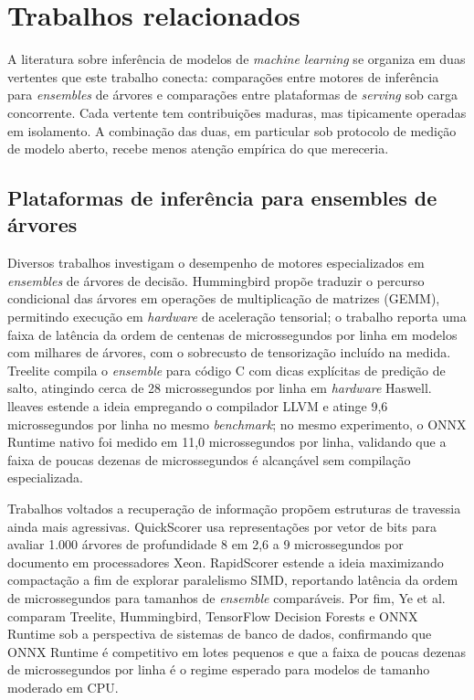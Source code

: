 \section{Trabalhos relacionados}

A literatura sobre inferência de modelos de \textit{machine learning} se
organiza em duas vertentes que este trabalho conecta: comparações entre
motores de inferência para \textit{ensembles} de árvores e comparações
entre plataformas de \textit{serving} sob carga concorrente. Cada vertente tem
contribuições maduras, mas tipicamente operadas em isolamento. A combinação
das duas, em particular sob protocolo de medição de modelo aberto, recebe
menos atenção empírica do que mereceria.

\subsection{Plataformas de inferência para ensembles de árvores}

Diversos trabalhos investigam o desempenho de motores especializados em
\textit{ensembles} de árvores de decisão. Hummingbird \cite{nakandala2020}
propõe traduzir o percurso condicional das árvores em operações de
multiplicação de matrizes (GEMM), permitindo execução em \textit{hardware}
de aceleração tensorial; o trabalho reporta uma faixa de latência da ordem
de centenas de microssegundos por linha em modelos com milhares de árvores,
com o sobrecusto de tensorização incluído na medida. Treelite
\cite{cho2018} compila o \textit{ensemble} para código C com dicas explícitas
de predição de salto, atingindo cerca de 28 microssegundos por linha em
\textit{hardware} Haswell. lleaves \cite{sieboehm2021} estende a ideia
empregando o compilador LLVM e atinge 9,6 microssegundos por linha no
mesmo \textit{benchmark}; no mesmo experimento, o ONNX Runtime nativo
foi medido em 11,0 microssegundos por linha, validando que a faixa de
poucas dezenas de microssegundos é alcançável sem compilação especializada.

Trabalhos voltados a recuperação de informação propõem estruturas de
travessia ainda mais agressivas. QuickScorer \cite{lucchese2015} usa
representações por vetor de bits para avaliar 1.000 árvores de profundidade
8 em 2,6 a 9 microssegundos por documento em processadores Xeon.
RapidScorer \cite{ye2018} estende a ideia maximizando compactação a fim
de explorar paralelismo SIMD, reportando latência da ordem de microssegundos
para tamanhos de \textit{ensemble} comparáveis. Por fim, Ye et al.
\cite{asadi2024} comparam Treelite, Hummingbird, TensorFlow Decision
Forests e ONNX Runtime sob a perspectiva de sistemas de banco de dados,
confirmando que ONNX Runtime é competitivo em lotes pequenos e que a
faixa de poucas dezenas de microssegundos por linha é o regime esperado para
modelos de tamanho moderado em CPU.

